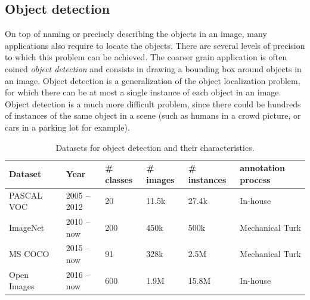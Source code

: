 \subsection{Object detection}

On top of naming or precisely describing the objects in an image,
many applications also require to locate the objects.
There are several levels of precision to which this problem can be achieved.
The coarser grain application is often coined \textit{object detection}
and consists in drawing a bounding box around objects in an image.
Object detection is a generalization of the object localization problem,
for which there can be at most a single instance of each object in an image.
Object detection is a much more difficult problem,
since there could be hundreds of instances of the same object in a scene
(such as humans in a crowd picture, or cars in a parking lot for example).

\begin{table}
\centering
\caption{Datasets for object detection and their characteristics.}
\begin{tabular}{llllll}
	Dataset & Year & \# classes & \# images & \# instances & annotation process \\
	\midrule
	PASCAL VOC~\cite{Everingham10} & 2005 -- 2012 & 20 & 11.5k & 27.4k & In-house \\
	ImageNet~\cite{ILSVRC15} & 2010 -- now & 200 & 450k & 500k & Mechanical Turk \\
	MS COCO~\cite{lin2014microsoft} & 2015 -- now & 91 & 328k & 2.5M & Mechanical Turk \\
	Open Images~\cite{OpenImages, OpenImages2} & 2016 -- now & 600 & 1.9M & 15.8M & In-house \\
\end{tabular}%
\label{tab:detection_ds}
\end{table}

